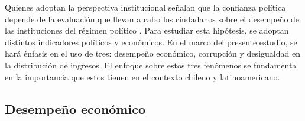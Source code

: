 \documentclass[12pt,twoside]{templates/facsothesis}
\begin{document}
Quienes adoptan la perspectiva institucional señalan que la confianza política depende de la evaluación que llevan a cabo los ciudadanos sobre el desempeño de las instituciones del régimen político \citep{vandermeerEconomicPerformancePolitical2018}. Para estudiar esta hipótesis, se adoptan distintos indicadores políticos y económicos. En el marco del presente estudio, se hará énfasis en el uso de tres: desempeño económico, corrupción y desigualdad en la distribución de ingresos. El enfoque sobre estos tres fenómenos se fundamenta en la importancia que estos tienen en el contexto chileno y latinoamericano.

\subsection{Desempeño económico}\label{desempeuxf1o-econuxf3mico}
\end{document}
